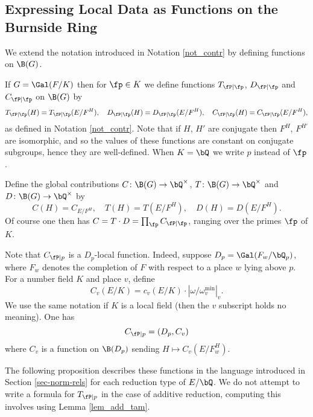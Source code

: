 \subsection{Expressing Local Data as Functions on the Burnside Ring}

We extend the notation introduced in Notation \ref{not_contr} by defining functions on $\B(G)$. 

\begin{notation}\label{not_contr_fns}
    If $G = \Gal(F / K)$ then for $\fp \in K$ we define functions $T_{\fP \mid \fp}$, $D_{\fP \mid \fp}$ and $C_{\fP \mid \fp}$ on $\B(G)$ by 
    \[ T_{\fP \mid \fp}(H) = T_{\fP \mid \fp}(E / F^H), \quad D_{\fP \mid \fp}(H) = D_{\fP \mid \fp}(E / F^H), \quad C_{\fP \mid \fp}(H) = C_{\fP \mid \fp}(E / F^H), \]
    as defined in Notation \ref{not_contr}.
    Note that if $H$, $H'$ are conjugate then $F^H$, $F^{H'}$ are isomorphic, and so the values of these functions are constant on conjugate subgroups, hence they are well-defined. When $K = \bQ$ we write $p$ instead of $\fp$. 
    
    Define the global contributions $C \colon \B(G) \to \bQ^{\times}$, $T \colon \B(G) \to \bQ^{\times}$ and $D \colon \B(G) \to \bQ^{\times}$ by 
    \[ C(H) = C_{E / F^H}, \quad T(H) = T(E / F^H), \quad D(H) = D(E / F^H). \] 
    Of course one then has $C = T \cdot D = \prod_{\fp} C_{\fP \mid \fp}$, ranging over the primes $\fp$ of $K$. 
\end{notation}

\begin{rem}\label{Rem-C-D-loc}
Note that $C_{\fP \mid p}$ is a $D_p$-local function. Indeed, suppose $D_p = \Gal(F_w / \bQ_p)$, where $F_w$ denotes the completion of $F$ with respect to a place $w$ lying above $p$. For a number field $K$ and place $v$, define $$C_v(E / K) = c_v(E / K) \cdot \left| \omega / \omega_v^{\min} \right|_v.$$ We use the same notation if $K$ is a local field (then the $v$ subscript holds no meaning).
One has
\begin{equation*}
    C_{\fP \mid p} = (D_p, C_v)
\end{equation*}
where $C_v$ is a function on $\B(D_p)$ sending $H \mapsto C_v(E / F_w^H)$.
\end{rem}

The following proposition describes these functions in the language introduced in Section \ref{sec-norm-rels} for each reduction type of $E / \bQ$. We do not attempt to write a formula for $T_{\fP \mid p}$ in the case of additive reduction, computing this involves using Lemma \ref{lem_add_tam}.

